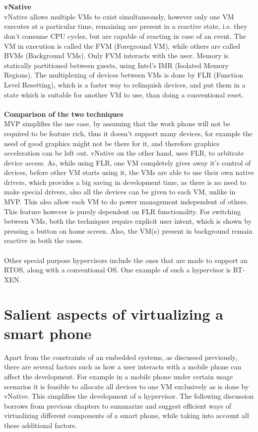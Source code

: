 \documentclass[seminar,twoside]{iitbreport}
\begin{document}
  \\\\
  \textbf{vNative}
  \\
  vNative allows multiple VMs to exist simultaneously, however only one VM executes at a particular time, remaining are present in a reactive state, i.e. they 
  don't consume CPU cycles, but are capable of reacting in case of an event. The VM in execution is called the FVM (Foreground VM), while others are called
  BVMs (Background VMs). Only FVM interacts with the user. Memory is statically partitioned between guests, using Intel's IMR (Isolated Memory Regions).
  The multiplexing of devices between VMs is done by FLR (Function Level Resetting), which is a faster way to relinquish devices, and put them in a state which
  is suitable for another VM to use, than doing a conventional reset.
  \\\\
  \textbf{Comparison of the two techniques}
  \\
  MVP simplifies the use case, by assuming that the work phone will not be required to be feature rich, thus it doesn't support many devices, for example the need of 
  good graphics might not be there for it, and therefore graphics acceleration can be left out.
  vNative on the other hand, uses FLR, to arbitrate device access. As, while using FLR, one VM completely gives away it's control of devices, before other
  VM starts using it, the VMs are able to use their own native drivers, which provides a big saving in development time, as there is no need to make special
  drivers, also all the devices can be given to each VM, unlike in MVP. This also allow each VM to do power management independent of others. This feature however is purely dependent on FLR functionality.
  For switching between VMs, both the techniques require explicit user intent, which is shown by pressing a button on home screen. Also, the VM(s) present in 
  background remain reactive in both the cases.
  \\\\
  Other special purpose hypervisors include the ones that are made to support an RTOS, along with a conventional OS. One example of such a hypervisor is RT-XEN\cite{6064510}.
 
 \section{Salient aspects of virtualizing a smart phone}
 Apart from the constraints of an embedded systems, as discussed previously, there are several factors such as how a user interacts with a mobile phone can affect the development.
 For example in a mobile phone under certain usage scenarios it is feasible to allocate all devices to one VM exclusively as is done by vNative\cite{7006388}. This
 simplifies the development of a hypervisor. The following discussion borrows from previous chapters to summarize and suggest efficient ways of virtualizing different components of a smart phone,
 while taking into account all these additional factors.
 
\end{document}
